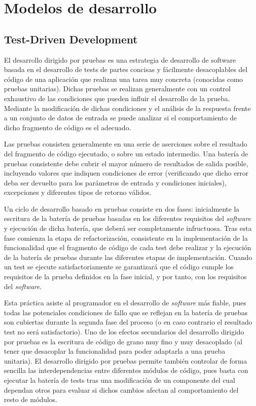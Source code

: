 \section{Modelos de desarrollo}
\subsection{Test-Driven Development}
\label{tdd}

El desarrollo dirigido por pruebas es una estrategia de desarrollo de software basada en el desarrollo de tests de partes concisas y fácilmente desacoplables del código de una aplicación que realizan una tarea muy concreta (conocidas como pruebas unitarias). Dichas pruebas se realizan generalmente con un control exhaustivo de las condiciones que pueden influir el desarrollo de la prueba. Mediante la modificación de dichas condiciones y el análisis de la respuesta frente a un conjunto de datos de entrada se puede analizar si el comportamiento de dicho fragmento de código es el adecuado.

Las pruebas consisten generalmente en una serie de aserciones sobre el resultado del fragmento de código ejecutado, o sobre un estado intermedio. Una batería de pruebas consistente debe cubrir el mayor número de resultados de salida posible, incluyendo valores que indiquen condiciones de error (verificando que dicho error deba ser devuelto para los parámetros de entrada y condiciones iniciales), excepciones y diferentes tipos de retorno válidos.

Un ciclo de desarrollo basado en pruebas consiste en dos fases: inicialmente la escritura de la batería de pruebas basadas en los diferentes requisitos del \textit{software} y ejecución de dicha batería, que deberá ser completamente infructuosa. Tras esta fase comienza la etapa de refactorización, consistente en la implementación de la funcionalidad que el fragmento de código de cada test debe realizar y la ejecución de la batería de pruebas durante las diferentes etapas de implementación. Cuando un test se ejecute satisfactoriamente se garantizará que el código cumple los requisitos de la prueba definidos en la fase inicial, y por tanto, con los requisitos del \textit{software}.

Esta práctica asiste al programador en el desarrollo de \textit{software} más fiable, pues todas las potenciales condiciones de fallo que se reflejan en la batería de pruebas son cubiertas durante la segunda fase del proceso (o en caso contrario el resultado test no será satisfactorio). Uno de los efectos secundarios del desarrollo dirigido por pruebas es la escritura de código de grano muy fino y muy desacoplado (al tener que desacoplar la funcionalidad para poder adaptarla a una prueba unitaria). El desarrollo dirigido por pruebas permite también controlar de forma sencilla las interdependencias entre diferentes módulos de código, pues basta con ejecutar la batería de tests tras una modificación de un componente del cual dependan otros para evaluar si dichos cambios afectan al comportamiento del resto de módulos.


